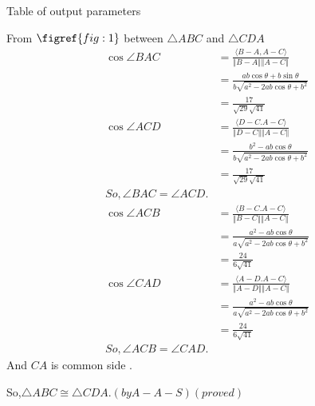 \documentclass[12pt]{article}
\newcommand\norm[1]{\left\Vert#1\right\Vert}
\providecommand{\brak}[1]{\ensuremath{\left(#1\right)}}
\providecommand{\innpdt}[1]{\ensuremath{\langle#1\rangle}}
\begin{document}
\begin{table}[H]
    \centering
    
    \caption{Table of output parameters}
    \label{tab:tab:2}
\end{table}  
From $\figref{fig:1}$ between $\triangle ABC $ and $\triangle CDA$
\begin{align}
\cos{\angle BAC} &= \frac{\innpdt{B-A,A-C}}{\norm{B-A}\norm{A-C}}\\
&=\frac{ab\cos{\theta}+b\sin{\theta}}{b\sqrt{a^2-2ab\cos{\theta}+b^2}}\\
&=\frac{17}{\sqrt{29}\sqrt{41}}\\
\cos{\angle ACD} &= \frac{\innpdt{D-C.A-C}}{\norm{D-C}\norm{A-C}}\\
&= \frac{b^2-ab\cos{\theta}}{b\sqrt{a^2-2ab\cos{\theta}+b^2}}\\
&=\frac{17}{\sqrt{29}\sqrt{41}}\\
So,\angle BAC = \angle ACD.\\
\cos{\angle ACB} &= \frac{\innpdt{B-C.A-C}}{\norm{B-C}\norm{A-C}}\\
&=\frac{a^2-ab\cos{\theta}}{a\sqrt{a^2-2ab\cos{\theta}+b^2}}\\
&=\frac{24}{6\sqrt{41}}\\
\cos{\angle} CAD &= \frac{\innpdt{A-D.A-C}}{\norm{A-D}\norm{A-C}}\\
&=\frac{a^2-ab\cos{\theta}}{a\sqrt{a^2-2ab\cos{\theta}+b^2}}\\
&=\frac{24}{6\sqrt{41}}\\
So,\angle ACB = \angle CAD.
\end{align}
And $CA$ is common side .

So,$\triangle ABC \cong \triangle CDA.\brak{by A-A-S}\brak{proved}$
\end{document}
